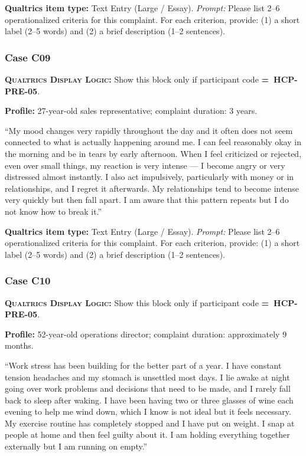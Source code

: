 \documentclass[11pt,a4paper]{article}
\newcommand{\responsetextarea}[1]{\begin{tcolorbox}[colback=ResponseBG,colframe=GoldAmber,boxrule=0.6pt,arc=1.5mm,left=6pt,right=6pt,top=5pt,bottom=5pt]\small\textbf{\color{GoldAmber}Qualtrics item type:} Text Entry (Large / Essay). \quad \textit{Prompt:} #1\end{tcolorbox}}
\newcommand{\dlnote}[1]{\par\vspace{0.15em}\noindent\begin{tcolorbox}[colback=AccentAmber,colframe=GoldAmber,boxrule=0.45pt,arc=1mm,left=5pt,right=5pt,top=2.5pt,bottom=2.5pt]\footnotesize\textbf{\color{GoldAmber}\scshape Qualtrics Display Logic:} Show this block only if participant code \textbf{=~#1}.\end{tcolorbox}\vspace{0.1em}}
\begin{document}
\responsetextarea{Please list 2--6 operationalized criteria for this complaint. For each criterion, provide: (1) a short label (2--5 words) and (2) a brief description (1--2 sentences).}

\vspace{0.4em}
\subsubsection*{Case C09}
\dlnote{HCP-PRE-05}

\begin{complaintbox}[title=Case C09 --- Complaint Vignette]
\textbf{Profile:} 27-year-old sales representative; complaint duration: 3 years.

\smallskip
``My mood changes very rapidly throughout the day and it often does not seem connected to what is actually happening around me. I can feel reasonably okay in the morning and be in tears by early afternoon. When I feel criticized or rejected, even over small things, my reaction is very intense --- I become angry or very distressed almost instantly. I also act impulsively, particularly with money or in relationships, and I regret it afterwards. My relationships tend to become intense very quickly but then fall apart. I am aware that this pattern repeats but I do not know how to break it.''
\end{complaintbox}

\responsetextarea{Please list 2--6 operationalized criteria for this complaint. For each criterion, provide: (1) a short label (2--5 words) and (2) a brief description (1--2 sentences).}

\vspace{0.4em}
\subsubsection*{Case C10}
\dlnote{HCP-PRE-05}

\begin{complaintbox}[title=Case C10 --- Complaint Vignette]
\textbf{Profile:} 52-year-old operations director; complaint duration: approximately 9 months.

\smallskip
``Work stress has been building for the better part of a year. I have constant tension headaches and my stomach is unsettled most days. I lie awake at night going over work problems and decisions that need to be made, and I rarely fall back to sleep after waking. I have been having two or three glasses of wine each evening to help me wind down, which I know is not ideal but it feels necessary. My exercise routine has completely stopped and I have put on weight. I snap at people at home and then feel guilty about it. I am holding everything together externally but I am running on empty.''
\end{complaintbox}
\end{document}
